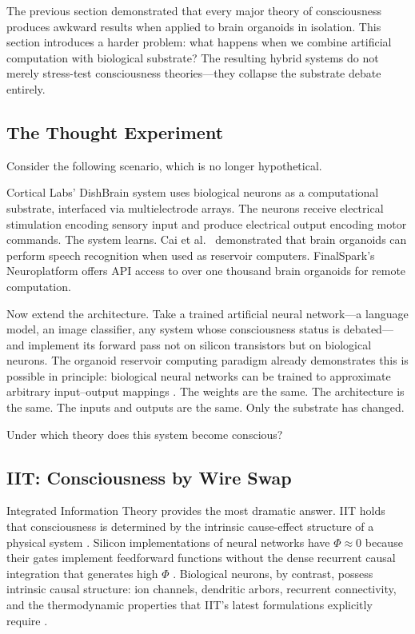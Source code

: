 
The previous section demonstrated that every major theory of consciousness produces
awkward results when applied to brain organoids in isolation. This section introduces
a harder problem: what happens when we combine artificial computation with biological
substrate? The resulting hybrid systems do not merely stress-test consciousness
theories---they collapse the substrate debate entirely.

\subsection{The Thought Experiment}

Consider the following scenario, which is no longer hypothetical.

Cortical Labs' DishBrain system \cite{kagan2022dishbrain} uses biological neurons as
a computational substrate, interfaced via multielectrode arrays. The neurons receive
electrical stimulation encoding sensory input and produce electrical output encoding
motor commands. The system learns. Cai et al.\ \cite{cai2023reservoir} demonstrated
that brain organoids can perform speech recognition when used as reservoir computers.
FinalSpark's Neuroplatform \cite{finalspark2024neuroplatform} offers API access to
over one thousand brain organoids for remote computation.

Now extend the architecture. Take a trained artificial neural network---a language
model, an image classifier, any system whose consciousness status is debated---and
implement its forward pass not on silicon transistors but on biological neurons. The
organoid reservoir computing paradigm already demonstrates this is possible in
principle: biological neural networks can be trained to approximate arbitrary
input--output mappings \cite{cai2023reservoir, iannello2025optogenetic}. The weights
are the same. The architecture is the same. The inputs and outputs are the same. Only
the substrate has changed.

Under which theory does this system become conscious?

\subsection{IIT: Consciousness by Wire Swap}

Integrated Information Theory provides the most dramatic answer. IIT holds that
consciousness is determined by the intrinsic cause-effect structure of a physical
system \cite{tononi2016integrated, albantakis2023iit4}. Silicon implementations of
neural networks have $\Phi \approx 0$ because their gates implement feedforward
functions without the dense recurrent causal integration that generates high $\Phi$
\cite{shin2025iit, tononi2025intrinsic}. Biological neurons, by contrast, possess
intrinsic causal structure: ion channels, dendritic arbors, recurrent connectivity,
and the thermodynamic properties that IIT's latest formulations explicitly require
\cite{tononi2025intrinsic}.

